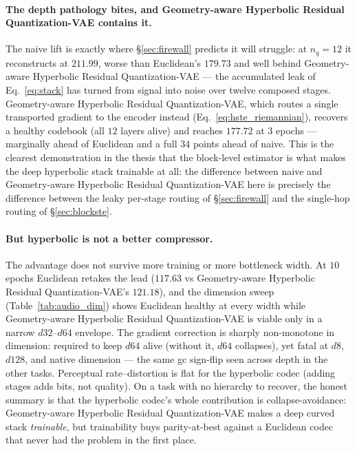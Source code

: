 \documentclass[12pt]{report}
\begin{document}
\paragraph{The depth pathology bites, and Geometry-aware Hyperbolic Residual Quantization-VAE contains it.} The naive lift is exactly where \S\ref{sec:firewall} predicts it will struggle: at $n_q=12$ it reconstructs at $211.99$, worse than Euclidean's $179.73$ and well behind Geometry-aware Hyperbolic Residual Quantization-VAE --- the accumulated leak of Eq.~\ref{eq:stack} has turned from signal into noise over twelve composed stages. Geometry-aware Hyperbolic Residual Quantization-VAE, which routes a single transported gradient to the encoder instead (Eq.~\ref{eq:hste_riemannian}), recovers a healthy codebook (all $12$ layers alive) and reaches $177.72$ at $3$ epochs --- marginally ahead of Euclidean and a full $34$ points ahead of naive. This is the clearest demonstration in the thesis that the block-level estimator is what makes the deep hyperbolic stack trainable at all: the difference between naive and Geometry-aware Hyperbolic Residual Quantization-VAE here is precisely the difference between the leaky per-stage routing of \S\ref{sec:firewall} and the single-hop routing of \S\ref{sec:blockste}.

\paragraph{But hyperbolic is not a better compressor.} The advantage does not survive more training or more bottleneck width. At $10$ epochs Euclidean retakes the lead ($117.63$ vs Geometry-aware Hyperbolic Residual Quantization-VAE's $121.18$), and the dimension sweep (Table~\ref{tab:audio_dim}) shows Euclidean healthy at every width while Geometry-aware Hyperbolic Residual Quantization-VAE is viable only in a narrow $d32$--$d64$ envelope. The gradient correction is sharply non-monotone in dimension: required to keep $d64$ alive (without it, $d64$ collapses), yet fatal at $d8$, $d128$, and native dimension --- the same gc sign-flip seen across depth in the other tasks. Perceptual rate--distortion is flat for the hyperbolic codec (adding stages adds bits, not quality). On a task with no hierarchy to recover, the honest summary is that the hyperbolic codec's whole contribution is collapse-avoidance: Geometry-aware Hyperbolic Residual Quantization-VAE makes a deep curved stack \emph{trainable}, but trainability buys parity-at-best against a Euclidean codec that never had the problem in the first place.
\end{document}
